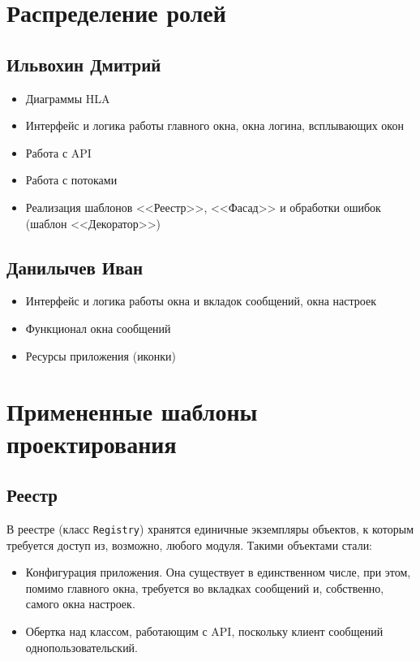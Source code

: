 \documentclass[12pt]{article}
\begin{document}
\newpage
\section{Распределение ролей}
\subsection{Ильвохин Дмитрий}
\begin{itemize}
\setlength{\itemsep}{-1mm} %
\item Диаграммы HLA
\item Интерфейс и логика работы главного окна, окна логина, всплывающих окон
\item Работа с API
\item Работа с потоками
\item Реализация шаблонов <<Реестр>>, <<Фасад>> и обработки ошибок (шаблон <<Декоратор>>)
\end{itemize}

\subsection{Данилычев Иван}
\begin{itemize}
\setlength{\itemsep}{-1mm}
\item Интерфейс и логика работы окна и вкладок сообщений, окна настроек
\item Функционал окна сообщений
\item Ресурсы приложения (иконки)
\end{itemize}



\newpage
\section{Примененные шаблоны проектирования}
\subsection{Реестр}
В реестре (класс {\tt Registry}) хранятся единичные экземпляры объектов, к которым требуется доступ из, возможно, любого модуля. Такими объектами стали:
\begin{itemize}
\setlength{\itemsep}{-1mm} %
\item Конфигурация приложения. Она существует в единственном числе, при этом, помимо главного окна, требуется во вкладках сообщений и, собственно, самого окна настроек.
\item Обертка над классом, работающим с API, поскольку клиент сообщений однопользовательский.
\end{itemize}
\end{document}
